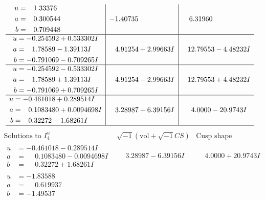 \documentclass[1p]{elsarticle_modified}
\theoremstyle{definition}
\newcommand{\I}{\sqrt{-1}}
\begin{document}
$$\begin{array}{c|c|c}
\begin{aligned}
u &= \phantom{-}1.33376\phantom{ +0.000000I} \\
a &= \phantom{-}0.300544\phantom{ +0.000000I} \\
b &= \phantom{-}0.709448\phantom{ +0.000000I}\end{aligned}
 & -1.40735\phantom{ +0.000000I} & \phantom{-}6.31960\phantom{ +0.000000I} \\ \hline\begin{aligned}
u &= -0.254592 + 0.533302 I \\
a &= \phantom{-}1.78589 - 1.39113 I \\
b &= -0.791069 - 0.709265 I\end{aligned}
 & \phantom{-}4.91254 + 2.99663 I & \phantom{-}12.79553 - 4.48232 I \\ \hline\begin{aligned}
u &= -0.254592 - 0.533302 I \\
a &= \phantom{-}1.78589 + 1.39113 I \\
b &= -0.791069 + 0.709265 I\end{aligned}
 & \phantom{-}4.91254 - 2.99663 I & \phantom{-}12.79553 + 4.48232 I \\ \hline\begin{aligned}
u &= -0.461018 + 0.289514 I \\
a &= \phantom{-}0.1083480 + 0.0094698 I \\
b &= \phantom{-}0.32272 - 1.68261 I\end{aligned}
 & \phantom{-}3.28987 + 6.39156 I & \phantom{-}4.0000 - 20.9743 I\\
 \hline 
 \end{array}$$\newpage$$\begin{array}{c|c|c}  
\text{Solutions to }I^u_{4}& \I (\text{vol} + \sqrt{-1}CS) & \text{Cusp shape}\\
 \hline 
\begin{aligned}
u &= -0.461018 - 0.289514 I \\
a &= \phantom{-}0.1083480 - 0.0094698 I \\
b &= \phantom{-}0.32272 + 1.68261 I\end{aligned}
 & \phantom{-}3.28987 - 6.39156 I & \phantom{-}4.0000 + 20.9743 I \\ \hline\begin{aligned}
u &= -1.83588\phantom{ +0.000000I} \\
a &= \phantom{-}0.619937\phantom{ +0.000000I} \\
b &= -1.49537\phantom{ +0.000000I}\end{aligned}

\end{array}$$
\end{document}
